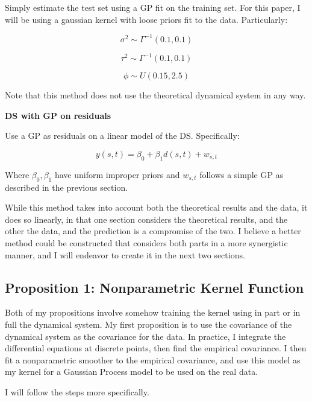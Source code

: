 \documentclass{article}
\begin{document}
	\label{simpleGauss}
	
	Simply estimate the test set using a GP fit on the training set. For this paper, I will be using a gaussian kernel with loose priors fit to the data. Particularly: 
	
	$$\sigma^2 \sim \Gamma^{-1}(0.1,0.1)$$
	
	$$\tau^2 \sim \Gamma^{-1}(0.1,0.1)$$
	
	$$ \phi \sim U(0.15, 2.5)$$
	
	Note that this method does not use the theoretical dynamical system in any way.
	
	\textbf{DS with GP on residuals}
	
	Use a GP as residuals on a linear model of the DS. Specifically:
	
	$$y(s,t) = \beta_0 + \beta_1 d(s,t) + w_{s,t}$$
	
	Where $\beta_0, \beta_1$ have uniform improper priors and $w_{s,t}$ follows a simple GP as described in the previous section.
	
	While this method takes into account both the theoretical results and the data, it does so linearly, in that one section considers the theoretical results, and the other the data, and the prediction is a compromise of the two. I believe a better method could be constructed that considers both parts in a more synergistic manner, and I will endeavor to create it in the next two sections. 
	
	\subsection{Proposition 1: Nonparametric Kernel Function}
	
	Both of my propositions involve somehow training the kernel using in part or in full the dynamical system. My first proposition is to use the covariance of the dynamical system as the covariance for the data. In practice, I integrate the differential equations at discrete points, then find the empirical covariance. I then fit a nonparametric smoother to the empirical covariance, and use this model as my kernel for a Gaussian Process model to be used on the real data. 
	
	I will follow the steps more specifically. 
	
\end{document}
